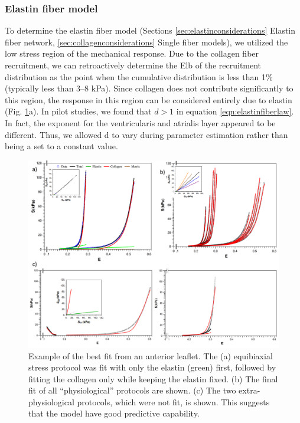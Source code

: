\subsubsection{Elastin fiber model} \label{c2:sec:elastinfibermodel}

    To determine the elastin fiber model (Sections \ref{sec:elastinconsiderations} Elastin fiber network, \ref{sec:collagenconsiderations} Single fiber models), we utilized the low stress region of the mechanical response. Due to the collagen fiber recruitment, we can retroactively determine the Elb of the recruitment distribution as the point when the cumulative distribution is less than 1\% (typically less than 3–8 kPa). Since collagen does not contribute significantly to this region, the response in this region can be considered entirely due to elastin (Fig. \ref{c2:fig:4}a). In pilot studies, we found that $d>1$ in equation \ref{eqn:elastinfiberlaw}. In fact, the exponent for the ventricularis and atrialis layer appeared to be different. Thus, we allowed d to vary during parameter estimation rather than being a set to a constant value.


\begin{figure}
\centering
\includegraphics[width=\textwidth]{Images/chapter2/figure4.pdf}
\caption{Example of the best fit from an anterior leaflet. The (a) equibiaxial stress protocol was fit with only the elastin (green) first, followed by fitting the collagen only while keeping the elastin fixed. (b) The final fit of all “physiological” protocols are shown. (c) The two extra-physiological protocols, which were not fit, is shown. This suggests that the model have good predictive capability.}
\label{c2:fig:4}
\end{figure}




